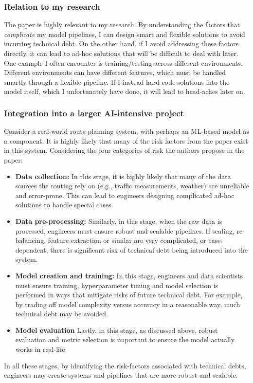 \documentclass[11pt]{article}
\begin{document}
\subsubsection{Relation to my research}

The paper is highly relevant to my research. By understanding the factors that \textit{complicate} my model pipelines, I can design smart and flexible solutions to avoid incurring technical debt. On the other hand, if I avoid addressing these factors directly, it can lead to ad-hoc solutions that will be difficult to deal with later. One example I often encounter is training/testing across different environments. Different environments can have different features, which must be handled smartly through a flexible pipeline. If I instead hard-code solutions into the model itself, which I unfortunately have done, it will lead to head-aches later on. 

\subsubsection{Integration into a larger AI-intensive project}

Consider a real-world route planning system, with perhaps an ML-based model as a component. It is highly likely that many of the risk factors from the paper exist in this system. Considering the four categories of risk the authors propose in the paper: 
\begin{itemize}
    \item \textbf{Data collection:} In this stage, it is highly likely that many of the data sources the routing rely on (e.g., traffic measurements, weather) are unreliable and error-prone. This can lead to engineers designing complicated ad-hoc solutions to handle special cases. 
    \item \textbf{Data pre-processing:} Similarly, in this stage, when the raw data is processed, engineers must ensure robust and scalable pipelines. If scaling, re-balancing, feature extraction or similar are very complicated, or case-dependent, there is significant risk of technical debt being introduced into the system.
    \item \textbf{Model creation and training:} In this stage, engineers and data scientists must ensure training, hyperparameter tuning and model selection is performed in ways that mitigate risks of future technical debt. For example, by trading off model complexity versus accuracy in a reasonable way, much technical debt may be avoided.
    \item \textbf{Model evaluation} Lastly, in this stage, as discussed above, robust evaluation and metric selection is important to ensure the model actually works in real-life.
\end{itemize}
In all these stages, by identifying the risk-factors associated with technical debts, engineers may create systems and pipelines that are more robust and scalable. 
\end{document}

